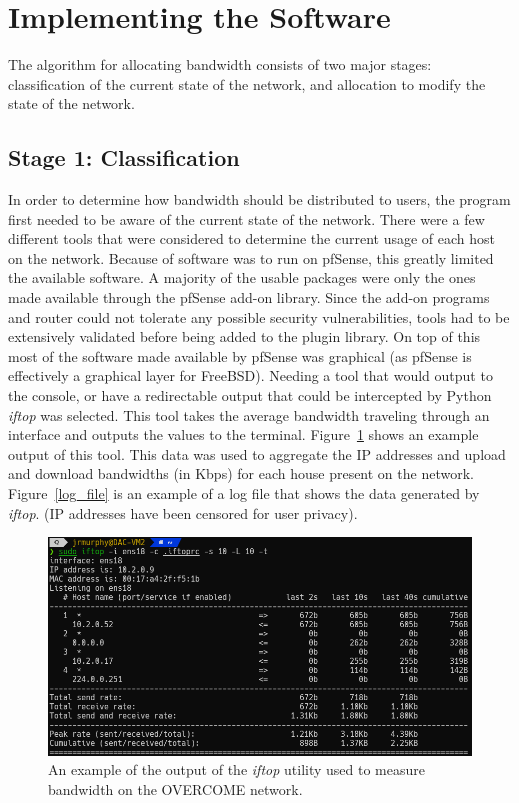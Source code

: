 \section{Implementing the Software}
The algorithm for allocating bandwidth consists of two major stages: classification of the current state of the network, and allocation to modify the state of the network.

\subsection{Stage 1: Classification}
In order to determine how bandwidth should be distributed to users, the program first needed to be aware of the current state of the network.
There were a few different tools that were considered to determine the current usage of each host on the network.
Because of software was to run on pfSense, this greatly limited the available software.
A majority of the usable packages were only the ones made available through the pfSense add-on library.
Since the add-on programs and router could not tolerate any possible security vulnerabilities, tools had to be extensively validated before being added to the plugin library.
On top of this most of the software made available by pfSense was graphical (as pfSense is effectively a graphical layer for FreeBSD).
Needing a tool that would output to the console, or have a redirectable output that could be intercepted by Python \textit{iftop} was selected.
This tool takes the average bandwidth traveling through an interface and outputs the values to the terminal.
Figure~\ref{iftop_out} shows an example output of this tool.
This data was used to aggregate the IP addresses and upload and download bandwidths (in Kbps) for each house present on the network.
Figure~\ref{log_file} is an example of a log file that shows the data generated by \textit{iftop}. (IP addresses have been censored for user privacy).\par
\begin{figure}[!ht]
    \centering
    \includegraphics[width=\textwidth,keepaspectratio]{Images/Chpt4/iftop_util.png}
    \caption{An example of the output of the \textit{iftop} utility used to measure bandwidth on the OVERCOME network.}
    \label{iftop_out}
\end{figure}
